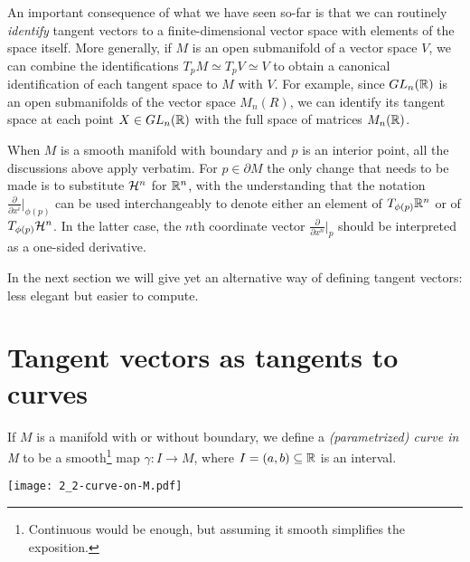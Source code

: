 An important consequence of what we have seen so-far is that we can routinely \emph{identify} tangent vectors to a finite-dimensional vector space with elements of the space itself.
More generally, if $M$ is an open submanifold of a vector space $V$, we can combine the identifications $T_p M \simeq T_p V \simeq V$ to obtain a canonical identification of each tangent space to $M$ with $V$.
For example, since $GL_n(\mathbb{R})$ is an open submanifolds of the vector space $M_n(R)$, we can identify its tangent space at each point $X\in GL_n(\mathbb{R})$ with the full space of matrices $M_n(\mathbb{R})$.

\begin{exe}
\end{exe}

\begin{rmk}
    When $M$ is a smooth manifold with boundary and $p$ is an interior point, all the discussions above apply verbatim.
    For $p\in\partial M$ the only change that needs to be made is to substitute $\mathcal{H}^n$ for $\mathbb{R}^n$, with the understanding that the notation $\frac{\partial}{\partial x^i}\big|_{\phi(p)}$ can be used interchangeably to denote either an element of $T_{\phi(p)}\mathbb{R}^n$ or of $T_{\phi(p)}\mathcal{H}^n$. In the latter case, the $n$th coordinate vector $\frac{\partial}{\partial x^n}\big|_{p}$ should be interpreted as a one-sided derivative.
\end{rmk}

In the next section we will give yet an alternative way of defining tangent vectors: less elegant but easier to compute.


\section{Tangent vectors as tangents to curves}

\begin{defn}
    If $M$ is a manifold with or without boundary, we define a \emph{(parametrized) curve in M} to be a smooth\footnote{Continuous would be enough, but assuming it smooth simplifies the exposition.} map $\gamma : I \to M$, where $I=(a,b)\subseteq\mathbb{R}$ is an interval.
\end{defn}
\begin{marginfigure}
    \texttt{[image: 2\_2-curve-on-M.pdf]}
\end{marginfigure}

